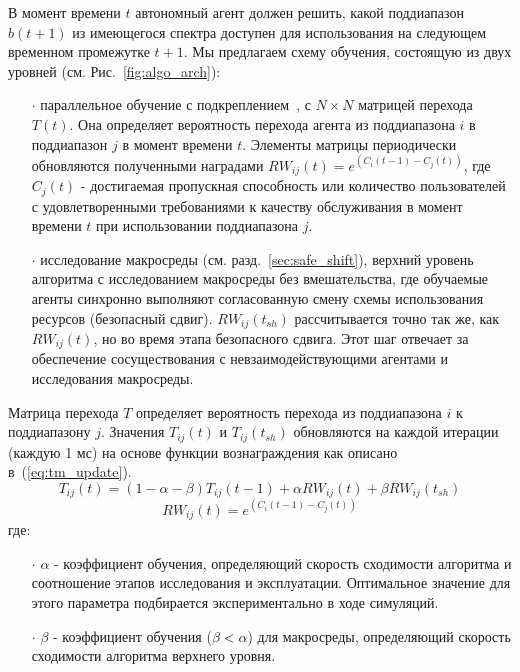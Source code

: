 В момент времени $t$ автономный агент должен решить, какой поддиапазон $b(t+1)$ из имеющегося спектра доступен для использования на следующем временном промежутке $t+1$. Мы предлагаем схему обучения, состоящую из двух уровней (см. Рис.~\ref{fig:algo_arch}):

\begin{itemize}
\item[$\cdot$] параллельное обучение с подкреплением~\cite{4445757}, с $N\times N$ матрицей перехода $T(t)$. Она определяет вероятность перехода агента из поддиапазона $i$ в поддиапазон $j$ в момент времени $t$. Элементы матрицы периодически обновляются полученными наградами $RW_{ij}(t) = e^{(C_i(t-1) - C_j(t))}$, где $C_j(t)$ - достигаемая пропускная способность или количество пользователей с удовлетворенными требованиями к качеству обслуживания в момент времени $t$ при использовании поддиапазона $j$.
\item[$\cdot$] исследование макросреды (см. разд.~\ref{sec:safe_shift}), верхний уровень алгоритма с исследованием макросреды без вмешательства, где обучаемые агенты синхронно выполняют согласованную смену схемы использования ресурсов (безопасный сдвиг). $RW_{ij}(t_{sh})$ рассчитывается точно так же, как $RW_{ij}(t)$, но во время этапа безопасного сдвига. Этот шаг отвечает за обеспечение сосуществования с невзаимодействующими агентами и исследования макросреды.
\end{itemize}

Матрица перехода $T$ определяет вероятность перехода из поддиапазона $i$ к поддиапазону $j$. Значения $T_{ij}(t)$ и $T_{ij}(t_{sh})$ обновляются на каждой итерации (каждую 1 мс) на основе функции вознаграждения как описано в~(\ref{eq:tm_update}).
\begin{equation}
    \label{eq:tm_update}
    T_{ij}(t) = (1-\alpha-\beta)T_{ij}(t-1) + \alpha RW_{ij}(t) + \beta RW_{ij}(t_{sh})
\end{equation}
\begin{equation}
    \label{eq:tm_update_c}
    RW_{ij}(t) = e^{(C_i(t-1) - C_j(t))}
\end{equation}
где:

\begin{itemize}
\item[$\cdot$]$ \alpha$ - коэффициент обучения, определяющий скорость сходимости алгоритма и соотношение этапов исследования и эксплуатации. Оптимальное значение для этого параметра подбирается экспериментально в ходе симуляций.
\item[$\cdot$] $\beta$ - коэффициент обучения ($\beta < \alpha$) для макросреды, определяющий скорость сходимости алгоритма верхнего уровня.
\end{itemize} 

